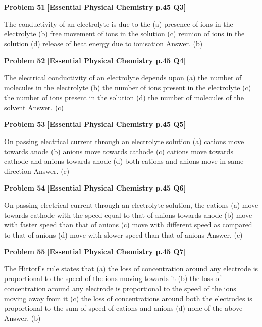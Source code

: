 \begin{problembox}
\textbf{Problem 51} \hfill \textbf{[Essential Physical Chemistry p.45 Q3]}
\label{q:ext-essential_all_questions-51}

The conductivity of an electrolyte is due to the
(a)
presence of ions in the electrolyte
(b)
free movement of ions in the solution
(c)
reunion of ions in the solution
(d)
release of heat energy due to ionisation
Answer. (b)
\end{problembox}

\begin{problembox}
\textbf{Problem 52} \hfill \textbf{[Essential Physical Chemistry p.45 Q4]}
\label{q:ext-essential_all_questions-52}

The electrical conductivity of an electrolyte depends upon
(a)
the number of molecules in the electrolyte
(b)
the number of ions present in the electrolyte
(c)
the number of ions present in the solution
(d)
the number of molecules of the solvent
Answer. (c)
\end{problembox}

\begin{problembox}
\textbf{Problem 53} \hfill \textbf{[Essential Physical Chemistry p.45 Q5]}
\label{q:ext-essential_all_questions-53}

On passing electrical current through an electrolyte solution
(a)
cations move towards anode
(b)
anions move towards cathode
(c)
cations move towards cathode and anions towards anode
(d)
both cations and anions move in same direction
Answer. (c)
\end{problembox}

\begin{problembox}
\textbf{Problem 54} \hfill \textbf{[Essential Physical Chemistry p.45 Q6]}
\label{q:ext-essential_all_questions-54}

On passing electrical current through an electrolyte solution, the cations
(a)
move towards cathode with the speed equal to that of anions towards anode
(b)
move with faster speed than that of anions
(c)
move with different speed as compared to that of anions
(d)
move with slower speed than that of anions
Answer. (c)
\end{problembox}

\begin{problembox}
\textbf{Problem 55} \hfill \textbf{[Essential Physical Chemistry p.45 Q7]}
\label{q:ext-essential_all_questions-55}

The Hittorf's rule states that
(a)
the loss of concentration around any electrode is proportional to the speed of the ions moving
towards it
(b)
the loss of concentration around any electrode is proportional to the speed of the ions moving
away from it
(c)
the loss of concentrations around both the electrodes is proportional to the sum of speed of
cations and anions
(d)
none of the above
Answer. (b)
\end{problembox}

